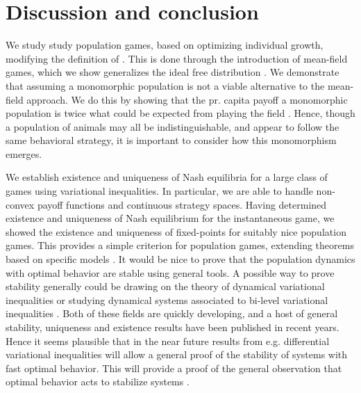 \section{Discussion and conclusion}
We study study population games, based on optimizing individual growth, modifying the definition of \citep{vincent2005evolutionary}. This is done through the introduction of mean-field games, which we show generalizes the ideal free distribution \citep{fretwell1969territorial}. We demonstrate that assuming a monomorphic population is not a viable alternative to the mean-field approach. We do this by showing that the pr. capita payoff a monomorphic population is twice what could be expected from playing the field  \citep{parker1978searching}. Hence, though a population of animals may all be indistinguishable, and appear to follow the same behavioral strategy, it is important to consider how this monomorphism emerges.


We establish existence and uniqueness of Nash equilibria for a large class of games using variational inequalities. In particular, we are able to handle non-convex payoff functions and continuous strategy spaces. Having determined existence and uniqueness of Nash equilibrium for the instantaneous game, we showed the existence and uniqueness of fixed-points for suitably nice population games. This provides a simple criterion for population games, extending theorems based on specific models \citep{cressman2010ideal,sandholm2010population}. It would be nice to prove that the population dynamics with optimal behavior are stable using general tools. A possible way to prove stability generally could be drawing on the theory of dynamical variational inequalities \citep{adly2018variational,brogliato2020dynamical, tang2020differential} or studying dynamical systems associated to bi-level variational inequalities \citep{anh2021dynamical}. Both of these fields are quickly developing, and a host of general stability, uniqueness and existence results have been published in recent years. Hence it seems plausible that in the near future results from e.g. differential variational inequalities will allow a general proof of the stability of systems with fast optimal behavior. This will provide a proof of the general observation that optimal behavior acts to stabilize systems \citep{valdovinos2010consequences}.





